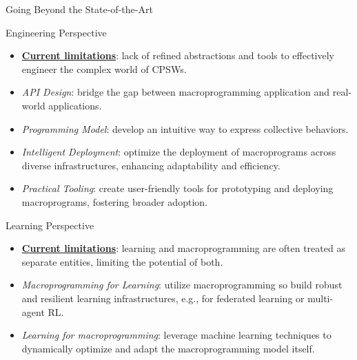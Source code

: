 \documentclass[presentation, 8pt,169]{beamer}\mode<presentation>{\usetheme{AMSBolognaFC}}
\begin{document}
\begin{frame}{Going Beyond the State-of-the-Art}

  \begin{alertblock}{Engineering Perspective}
    \begin{itemize}
        \item \textbf{\underline{Current limitations}}: lack of refined abstractions and tools to effectively engineer the complex world of CPSWs.
        \item \emph{API Design}: bridge the gap between macroprogramming application and real-world applications.
        \item \emph{Programming Model}: develop an intuitive way to express collective behaviors.
        \item \emph{Intelligent Deployment}: optimize the deployment of macroprograms across diverse infrastructures, enhancing adaptability and efficiency.
        \item \emph{Practical Tooling}: create user-friendly tools for prototyping and deploying macroprograms, fostering broader adoption.
    \end{itemize}
  \end{alertblock}

  \begin{alertblock}{Learning Perspective}
    \begin{itemize}
        \item \textbf{\underline{Current limitations}}: learning and macroprogramming are often treated as separate entities, limiting the potential of both.
        \item \emph{Macroprogramming for Learning}: utilize macroprogramming so build robust and resilient learning infrastructures, e.g., for federated learning or multi-agent RL.
        \item \emph{Learning for macroprogramming}: leverage machine learning techniques to dynamically optimize and adapt the macroprogramming model itself.
    \end{itemize}
  \end{alertblock}

\end{frame}
\end{document}

